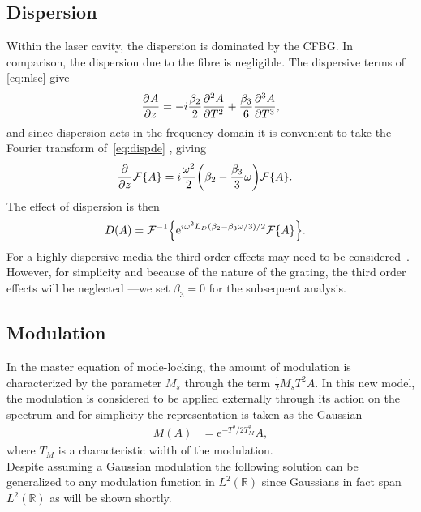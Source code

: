 \subsection{Dispersion}
Within the laser cavity, the dispersion is dominated by the CFBG. In comparison, the dispersion due to the fibre is negligible. The dispersive terms of \eqref{eq:nlse} give
\begin{align}
\label{eq:dispde}
	\pdiff{A}{z} = -i \frac{\beta_2}{2} \pdiff[2]{A}{T} + \frac{\beta_3}{6} \pdiff[3]{A}{T},
\end{align}
and since dispersion acts in the frequency domain it is convenient to take the Fourier transform of~\eqref{eq:dispde} \cite{debnath, gradshteyn}, giving
\begin{align*}
	\pdiff{}{z}\FT{A} &= i\frac{\omega^2}{2}\left(\beta_2 - \frac{\beta_3}{3} \omega\right) \FT{A}.
\end{align*}
The effect of dispersion is then
\begin{align*}
D(A) &= \FTi{\textrm{e}^{i \omega^2 L_D(\beta_2 - \beta_3 \omega/3)/2} \FT{A}}.
\end{align*}
For a highly dispersive media the third order effects may need to be considered~\cite{agrawal2013, litchinitser}. However, for simplicity and because of the nature of the grating, the third order effects will be neglected \cite{agrawal2013, ferreira}---we set $\beta_3=0$ for the subsequent analysis. \\

\subsection{Modulation}
In the master equation of mode-locking, the amount of modulation is characterized by the parameter $M_s$ through the term $\frac{1}{2} M_s T^2 A$. In this new model, the modulation is considered to be applied externally through its action on the spectrum and for simplicity the representation is taken as the Gaussian
\begin{align*}
M(A) &= \textrm{e}^{-T^2 / 2 T_M^2} A,
\end{align*}
where $T_M$ is a characteristic width of the modulation. \\

Despite assuming a Gaussian modulation the following solution can be generalized to any modulation function in $L^2(\mathbb{R})$ since Gaussians in fact span $L^2(\mathbb{R})$ as will be shown shortly. \\

